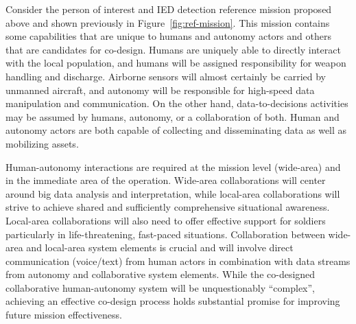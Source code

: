 Consider the person of interest and IED detection reference mission proposed above and
shown previously in Figure~\ref{fig:ref-mission}.  This mission contains some capabilities that are
unique to humans and autonomy actors and others that are candidates for co-design.
Humans are uniquely able to directly interact with the local population, and humans will
be assigned responsibility for weapon handling and discharge.  Airborne sensors will almost 
certainly be carried by unmanned aircraft, and autonomy will be responsible for high-speed 
data manipulation and communication.  On the other hand, data-to-decisions activities may be 
assumed by humans, autonomy, or a collaboration of both.  Human and autonomy actors are both
capable of collecting and disseminating data as well as mobilizing assets. 

Human-autonomy interactions are required at the mission level (wide-area) and in the immediate
area of the operation.  Wide-area collaborations will center around big data analysis 
and interpretation, while local-area collaborations will strive to achieve shared 
and sufficiently comprehensive situational awareness.  Local-area collaborations will also need to offer 
effective support for soldiers particularly in life-threatening, fast-paced situations. 
Collaboration between wide-area and local-area system elements is crucial and will involve
direct communication (voice/text) from human actors in combination with data streams from 
autonomy and collaborative system elements.  While the co-designed collaborative human-autonomy 
system will be unquestionably 
``complex'', achieving an effective co-design process holds substantial promise for improving
future mission effectiveness.
